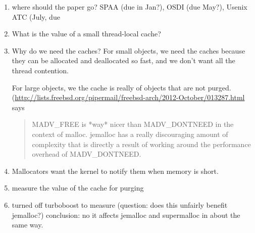 \begin{enumerate}
 \item where should the paper go?  SPAA (due in Jan?), OSDI (due May?), Usenix ATC (July, due

 \item What is the value of a small thread-local cache?

 \item Why do we need the caches?
  For small objects, we need the caches because they can be allocated and deallocated so fast, and we don't want all the thread contention.

  For large objects, we the cache is really of objects that are not purged.  (\url{http://lists.freebsd.org/pipermail/freebsd-arch/2012-October/013287.html} says 
\begin{quote}
MADV\_FREE is *way* nicer than MADV\_DONTNEED in the context of malloc.  jemalloc has a really discouraging amount of complexity that is directly a result of working around the performance overhead of MADV\_DONTNEED.
\end{quote}
 
 \item Mallocators want the kernel to notify them when memory is short.

 \item measure the value of the cache for purging

 \item turned off turboboost to measure (question: does this unfairly benefit jemalloc?)
   conclusion: no it affects jemalloc and supermalloc in about the same way.
\end{enumerate}
